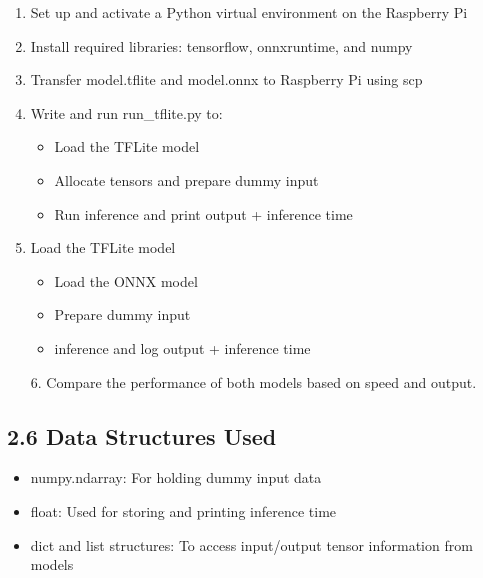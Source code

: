 \documentclass[12pt]{article}
\begin{document}
\begin{enumerate}

\item  Set up and activate a Python virtual environment on the Raspberry Pi

\item  Install required libraries: tensorflow, onnxruntime, and numpy

\item  Transfer model.tflite and model.onnx to Raspberry Pi using scp


\item  Write and run run\_tflite.py to:
  \begin{itemize}
  \item Load the TFLite model 
  \item Allocate tensors and prepare dummy input
 \item  Run inference and print output + inference time
  
\end{itemize}
\item Load the TFLite model 
  \begin{itemize}
 \item	Load the ONNX model
 \item	Prepare dummy input
 \item inference and log output + inference time
  \end{itemize}


6. Compare the performance of both models based on speed and output.

\end{enumerate}

\subsection*{2.6 Data Structures Used}
\begin{itemize}
\item numpy.ndarray: For holding dummy input data

 \item  float: Used for storing and printing inference time

 \item dict and list structures: To access input/output tensor information from models

\end{itemize}
\end{document}
